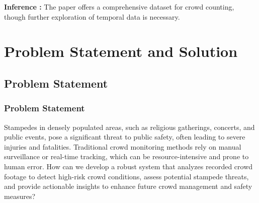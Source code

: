 \documentclass[11pt]{report}
\begin{document}
\textbf{Inference : }  
The paper offers a comprehensive dataset for crowd counting, though further exploration of temporal data is necessary.

\chapter{Problem Statement and Solution}
 \section{Problem Statement}
    \subsection{\label{ps}Problem Statement}
    
Stampedes in densely populated areas, such as religious gatherings, concerts, and public events, pose a significant threat to public safety, often leading to severe injuries and fatalities. Traditional crowd monitoring methods rely on manual surveillance or real-time tracking, which can be resource-intensive and prone to human error. How can we develop a robust system that analyzes recorded crowd footage to detect high-risk crowd conditions, assess potential stampede threats, and provide actionable insights to enhance future crowd management and safety measures?
\end{document}
